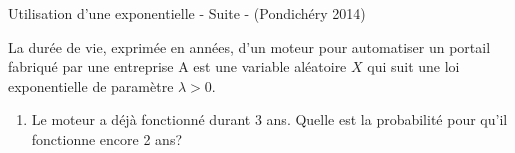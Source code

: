 \begin{methode}{Utilisation d'une exponentielle - Suite - (Pondichéry
2014)}

La durée de vie, exprimée en années, d'un moteur pour automatiser un
portail fabriqué par une entreprise A est une variable aléatoire \(X\)
qui suit une loi exponentielle de paramètre \(\lambda>0\).

\begin{enumerate}
\def\labelenumi{\arabic{enumi}.}
\setcounter{enumi}{3}
\itemsep1pt\parskip0pt
\item
  Le moteur a déjà fonctionné durant 3 ans. Quelle est la probabilité
  pour qu'il fonctionne encore 2 ans?
\end{enumerate}

\end{methode}


